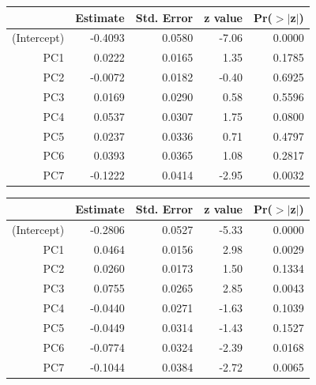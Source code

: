 \documentclass[a4paper,12pt]{Latex/Classes/PhDthesisPSnPDF}
\begin{document}
\newpage
\begin{center}
\begin{table}[ht]
\centering
\begin{tabular}{rrrrr}
  \hline
 & Estimate & Std. Error & z value & Pr($>$$|$z$|$) \\ 
  \hline
(Intercept) & -0.4093 & 0.0580 & -7.06 & 0.0000 \\ 
  PC1 & 0.0222 & 0.0165 & 1.35 & 0.1785 \\ 
  PC2 & -0.0072 & 0.0182 & -0.40 & 0.6925 \\ 
  PC3 & 0.0169 & 0.0290 & 0.58 & 0.5596 \\ 
  PC4 & 0.0537 & 0.0307 & 1.75 & 0.0800 \\ 
  PC5 & 0.0237 & 0.0336 & 0.71 & 0.4797 \\ 
  PC6 & 0.0393 & 0.0365 & 1.08 & 0.2817 \\ 
  PC7 & -0.1222 & 0.0414 & -2.95 & 0.0032 \\ 
   \hline
\end{tabular}
\end{table}\end{center}
\begin{center}
\begin{table}[ht]
\centering
\begin{tabular}{rrrrr}
  \hline
 & Estimate & Std. Error & z value & Pr($>$$|$z$|$) \\ 
  \hline
(Intercept) & -0.2806 & 0.0527 & -5.33 & 0.0000 \\ 
  PC1 & 0.0464 & 0.0156 & 2.98 & 0.0029 \\ 
  PC2 & 0.0260 & 0.0173 & 1.50 & 0.1334 \\ 
  PC3 & 0.0755 & 0.0265 & 2.85 & 0.0043 \\ 
  PC4 & -0.0440 & 0.0271 & -1.63 & 0.1039 \\ 
  PC5 & -0.0449 & 0.0314 & -1.43 & 0.1527 \\ 
  PC6 & -0.0774 & 0.0324 & -2.39 & 0.0168 \\ 
  PC7 & -0.1044 & 0.0384 & -2.72 & 0.0065 \\ 
   \hline
\end{tabular}
\end{table}\end{center}
\end{document}
